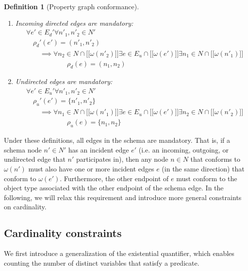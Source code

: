 \documentclass[a4paper]{article}
\newtheorem{definition}[theorem]{Definition}
\newcommand{\lsem}{\ensuremath{[\![}}
\newcommand{\rsem}{\ensuremath{]\!]}}
\newcommand{\sem}[1]{\ensuremath{\lsem #1 \rsem}}
\begin{document}
\begin{definition}[Property graph conformance]
\begin{enumerate}
    \item Incoming directed edges are mandatory:
    \begin{align*}
      &\forall e' \in E_d' \forall n'_1, n'_2 \in N'\\
      &\quad\rho_d'(e') = (n'_1, n'_2)\\
      &\quad\quad\implies {} \forall n_2 \in N \cap \sem{\omega(n'_2)} \exists e \in E_u \cap \sem{\omega(e')} \exists n_1 \in N \cap \sem{\omega(n'_1)}\\
      &\quad\quad\quad\quad\quad\quad\rho_d(e) = (n_1, n_2)
    \end{align*}
    
    \item Undirected edges are mandatory:
    \begin{align*}
      &\forall e' \in E_u' \forall n'_1, n'_2 \in N'\\
      &\quad\rho_u'(e') = \{n'_1, n'_2\}\\
      &\quad\quad\implies {} \forall n_1 \in N \cap \sem{\omega(n'_1)} \exists e \in E_u \cap \sem{\omega(e')} \exists n_2 \in N \cap \sem{\omega(n'_2)}\\
      &\quad\quad\quad\quad\quad\quad\rho_u(e) = \{n_1, n_2\}
    \end{align*}
  \end{enumerate}
\end{definition}

Under these definitions, all edges in the schema are mandatory. That is, if a schema node $n' \in N'$ has an incident edge $e'$ (i.e. an incoming, outgoing, or undirected edge that $n'$ participates in), then any node $n \in N$ that conforms to $\omega(n')$ must also have one or more incident edges $e$ (in the same direction) that conform to $\omega(e')$. Furthermore, the other endpoint of $e$ must conform to the object type associated with the other endpoint of the schema edge. In the following, we will relax this requirement and introduce more general constraints on cardinality.

\subsection{Cardinality constraints}

We first introduce a generalization of the existential quantifier, which enables counting the number of distinct variables that satisfy a predicate.
\end{document}

